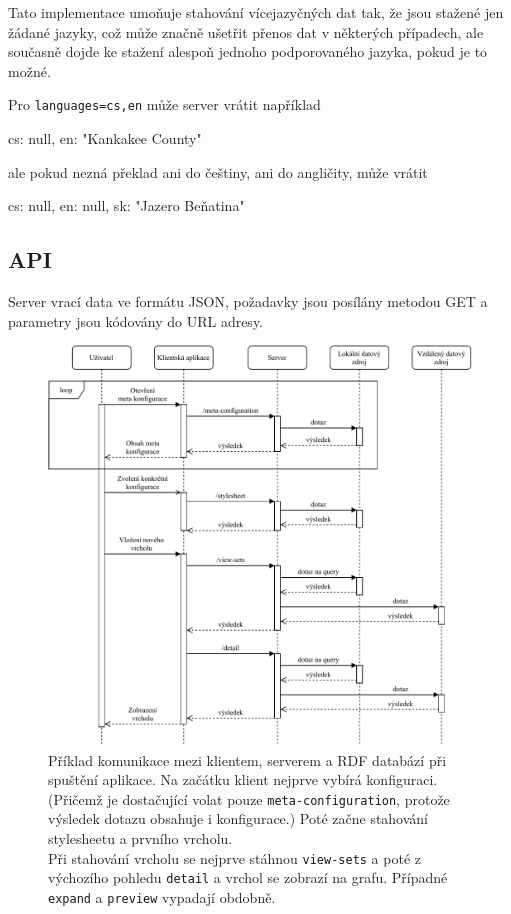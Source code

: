 Tato implementace umoňuje stahování vícejazyčných dat tak, že jsou stažené jen žádané jazyky, což může značně ušetřit přenos dat v některých případech, ale současně dojde ke stažení alespoň jednoho podporovaného jazyka, pokud je to možné.

\begin{prikl}
Pro \texttt{languages=cs,en} může server vrátit například
\begin{code}[frame=none]
{
    cs: null,
    en: "Kankakee County"
}
\end{code}
ale pokud nezná překlad ani do češtiny, ani do angličity, může vrátit
\begin{code}[frame=none]
{
    cs: null,
    en: null,
    sk: "Jazero Beňatina"
}
\end{code}
\end{prikl}

\subsection{API}
Server vrací data ve formátu JSON, požadavky jsou posílány metodou GET a parametry jsou kódovány do URL adresy.

\begin{figure}[p]
    \centering
    \includegraphics[width=\textwidth]{media/sequence-server.pdf}
    \caption{Příklad komunikace mezi klientem, serverem a RDF databází při spuštění aplikace. Na začátku klient nejprve vybírá konfiguraci. (Přičemž je dostačující volat pouze \texttt{meta-configuration}, protože výsledek dotazu obsahuje i konfigurace.) Poté začne stahování stylesheetu a prvního vrcholu. \\ Při stahování vrcholu se nejprve stáhnou \texttt{view-sets} a poté z výchozího pohledu \texttt{detail} a vrchol se zobrazí na grafu. Případné \texttt{expand} a \texttt{preview} vypadají obdobně.}
\end{figure}

